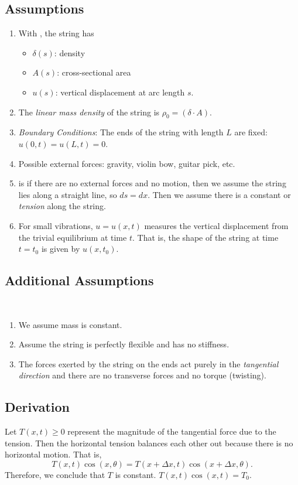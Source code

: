 \documentclass[class=article,crop=false]{standalone}
\begin{document}
\subsection{Assumptions}
\begin{enumerate}[label=\arabic*)]
	\item With , the string has
		\begin{itemize}
			\item $ \delta(s)$: density
			\item $ A(s)$: cross-sectional area
			\item $ u(s)$: vertical displacement at arc length $ s$.
		\end{itemize}
	\item The \emph{linear mass density} of the string is $ \rho_0 = ( \delta \cdot A)$.
	\item \emph{Boundary Conditions}:  The ends of the string with length $ L$ are fixed:
		$ u(0,t)=u(L,t)=0$.
	\item Possible external forces: gravity, violin bow, guitar pick, etc.
	\item  {} is if there are no external forces and no motion, then we assume the string lies along a straight line, so $ ds=dx$. Then we assume there is a constant   or \emph{tension} along the string.
	\item For small vibrations, $ u=u(x,t)$ measures the vertical displacement from the trivial equilibrium at time  $ t$. That is, the shape of the string at time  $ t=t_0$ is given by $ u(x,t_0)$.
\end{enumerate}

\subsection{Additional Assumptions}
~\begin{enumerate}[label=\arabic*)]
	\item We assume mass is constant.
	\item Assume the string is perfectly flexible and has no stiffness.
	\item The forces exerted by the string on the ends act purely in the \emph{tangential direction} and there are no transverse forces and no torque (twisting).
\end{enumerate}

\subsection{Derivation}
Let $ T(x,t) \geq 0$ represent the magnitude of the tangential force due to the tension. Then the horizontal tension balances each other out because there is no horizontal motion. That is,
 \[
	 T(x,t) \cos(x, \theta ) = T(x+ \Delta x, t) \cos(x+ \Delta x, \theta )
.\] 
Therefore, we conclude that $ T$ is constant.  $ T(x,t)\cos(x,t ) = T_0$.
\end{document}
